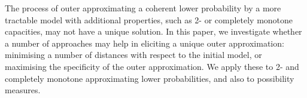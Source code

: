 
The process of outer approximating a coherent lower probability by a more tractable model with additional properties, such as 2- or completely monotone capacities, may not have a unique solution. In this paper, we investigate whether a number of approaches may help in eliciting a unique outer approximation: minimising a number of distances with respect to the initial model, or maximising the specificity of the outer approximation. We apply these to 2- and completely monotone approximating lower probabilities, and also to possibility measures.


